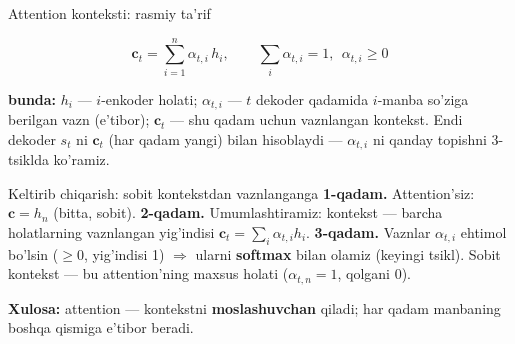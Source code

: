 \documentclass[aspectratio=169,11pt]{beamer}
\newcommand{\bunda}[1]{{\small\textbf{bunda:}\; #1}}
\begin{document}
\begin{frame}{Attention konteksti: rasmiy ta'rif}
  \begin{tcolorbox}[defbox,title=Ta'rif: dekoder qadami uchun kontekst]
    \vspace{-0.4em}
    $$ \mathbf{c}_t = \sum_{i=1}^{n} \alpha_{t,i}\, h_i, \qquad
       \sum_i \alpha_{t,i} = 1,\ \ \alpha_{t,i} \ge 0 $$
  \end{tcolorbox}
  \vspace{2pt}
  \bunda{$h_i$ --- $i$-enkoder holati; $\alpha_{t,i}$ --- $t$ dekoder qadamida
  $i$-manba so'ziga berilgan vazn (e'tibor); $\mathbf{c}_t$ --- shu qadam uchun
  vaznlangan kontekst.}
  \vspace{4pt}
  \footnotesize Endi dekoder $s_t$ ni $\mathbf{c}_t$ (har qadam yangi) bilan
  hisoblaydi --- $\alpha_{t,i}$ ni qanday topishni 3-tsiklda ko'ramiz.
\end{frame}

\begin{frame}{Keltirib chiqarish: sobit kontekstdan vaznlanganga}
  \textbf{1-qadam.} Attention'siz: $\mathbf{c}=h_n$ (bitta, sobit).
  \pause
  \textbf{2-qadam.} Umumlashtiramiz: kontekst --- barcha holatlarning vaznlangan
  yig'indisi $\mathbf{c}_t=\sum_i \alpha_{t,i} h_i$.
  \pause
  \textbf{3-qadam.} Vaznlar $\alpha_{t,i}$ ehtimol bo'lsin ($\ge 0$, yig'indisi 1)
  $\Rightarrow$ ularni \textbf{softmax} bilan olamiz (keyingi tsikl). Sobit kontekst
  --- bu attention'ning maxsus holati ($\alpha_{t,n}=1$, qolgani 0).
  \begin{tcolorbox}[okbox,top=2pt,bottom=2pt]
    \small \textbf{Xulosa:} attention --- kontekstni \textbf{moslashuvchan} qiladi;
    har qadam manbaning boshqa qismiga e'tibor beradi.
  \end{tcolorbox}
\end{frame}
\end{document}
